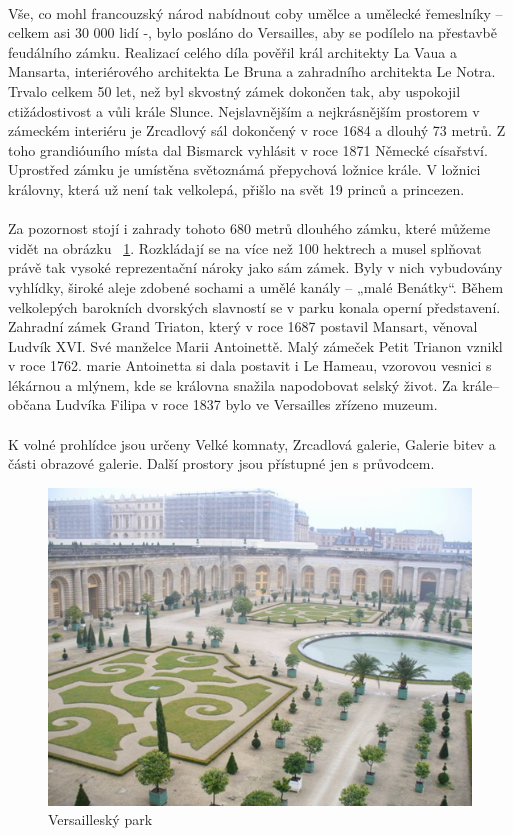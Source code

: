 \begin{figure}[h!]
\end{figure}\\Vše, co mohl francouzský národ nabídnout coby umělce a umělecké řemeslníky – celkem asi 30 000 lidí -, bylo posláno do Versailles, aby se podílelo na přestavbě feudálního zámku. Realizací celého díla pověřil král architekty La Vaua a Mansarta, interiérového architekta Le Bruna a zahradního architekta Le Notra. Trvalo celkem 50 let, než byl skvostný zámek dokončen tak, aby uspokojil ctižádostivost a vůli krále Slunce. Nejslavnějším a nejkrásnějším prostorem v zámeckém interiéru je Zrcadlový sál dokončený v roce 1684 a dlouhý 73 metrů. Z toho grandióuního místa dal Bismarck vyhlásit v roce 1871 Německé císařství. Uprostřed zámku je umístěna světoznámá přepychová ložnice krále. V ložnici královny, která už není tak velkolepá, přišlo na svět 19 princů a princezen.\\\\Za pozornost stojí i zahrady tohoto 680 metrů dlouhého zámku, které můžeme vidět na obrázku ~\ref{ver2}. Rozkládají se na více než 100 hektrech a musel splňovat právě tak vysoké reprezentační nároky jako sám zámek. Byly v nich vybudovány vyhlídky, široké aleje zdobené sochami a umělé kanály – „malé Benátky“. Během velkolepých barokních dvorských slavností se v parku konala operní představení. Zahradní zámek Grand Triaton, který v roce 1687 postavil Mansart, věnoval Ludvík XVI. Své manželce Marii Antoinettě. Malý zámeček Petit Trianon vznikl v roce 1762. marie Antoinetta si dala postavit i Le Hameau, vzorovou vesnici s lékárnou a mlýnem, kde se královna snažila napodobovat selský život. Za krále–občana Ludvíka Filipa v roce 1837 bylo ve Versailles zřízeno muzeum.\\\\K volné prohlídce jsou určeny Velké komnaty, Zrcadlová galerie, Galerie bitev a části obrazové galerie. Další prostory jsou přístupné jen s průvodcem.\cite{rodreguaze}

\begin{figure}[h!]
\centering
\includegraphics[scale=0.5]{images/obr11V.jpg}
\caption{Versailleský park}
\label{ver2}

\end{figure}
